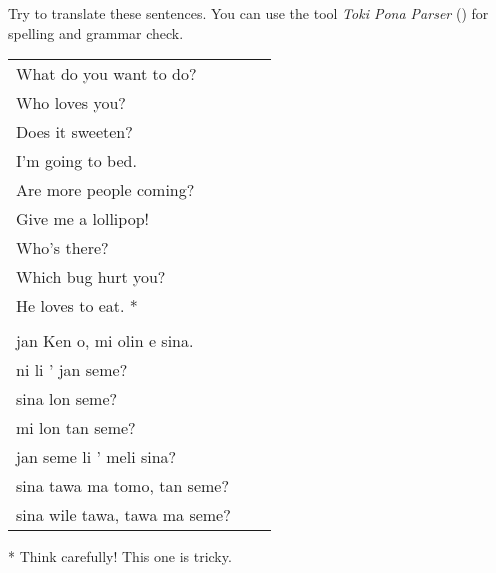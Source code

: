 Try to translate these sentences. 
You can use the tool \textit{Toki Pona Parser} (\cite{www:rowa:02}) for spelling and grammar check. 

\begin{supertabular}{p{5,5cm}|ll}
What do you want to do? &&   \\ %
Who loves you? &&   \\ %
Does it sweeten?  &&  \\ %
I'm going to bed. && \\  %
Are more people coming? &&  \\  %
Give me a lollipop! && \\   %
Who's there? &&   \\ %
Which bug hurt you?  &&  \\ %
He loves to eat. * &&  \\ %
 && \\ %
jan Ken o, mi olin e sina.  && \\  %
ni li ' jan seme?  && \\  %
sina lon seme?   && \\  %
mi lon tan seme?  && \\  %
jan seme li ' meli sina?   && \\    %
sina tawa ma tomo, tan seme?    && \\   %
sina wile tawa, tawa  ma seme?      && \\  %
\end{supertabular} 

* Think carefully! This one is tricky. 
